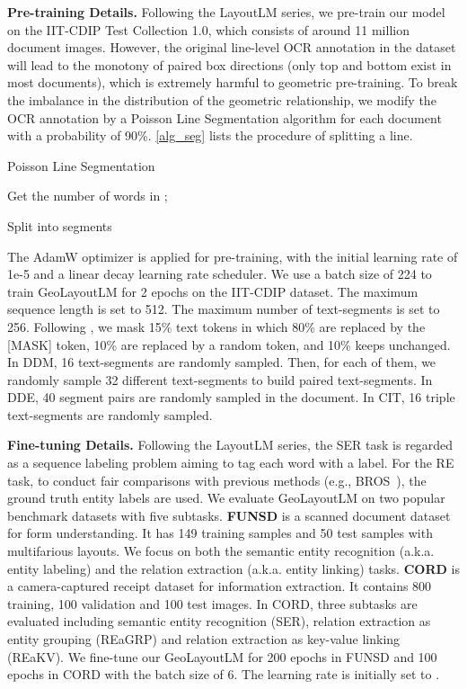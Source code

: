 \documentclass[10pt,twocolumn,letterpaper]{article}
\begin{document}
\noindent \textbf{Pre-training Details.}
Following the LayoutLM series\cite{xu2020layoutlm,xu2020layoutlmv2,huang2022layoutlmv3}, we pre-train our model on the IIT-CDIP Test Collection 1.0\cite{lewis2006building}, which consists of around 11 million document images.
However, the original line-level OCR annotation in the dataset will lead to the monotony of paired box directions (only top and bottom exist in most documents), which is extremely harmful to geometric pre-training.
To break the imbalance in the distribution of the geometric relationship, we modify the OCR annotation by a Poisson Line Segmentation algorithm for each document with a probability of 90\%. \cref{alg_seg} lists the procedure of splitting a line.

\begin{algorithm}
  \caption{Poisson Line Segmentation}\label{alg_seg}
  Get the number of words in \;
  ; \footnotesize{}
  \eIf{} {
    
  }{
    \;
    Split  into  segments \;
  }
\end{algorithm}

The AdamW optimizer is applied for pre-training, with the initial learning rate of 1e-5 and a linear decay learning rate scheduler.
We use a batch size of 224 to train GeoLayoutLM for 2 epochs on the IIT-CDIP dataset.
The maximum sequence length is set to 512. The maximum number of text-segments is set to 256.
Following \cite{xu2020layoutlm,xu2020layoutlmv2,huang2022layoutlmv3}, we mask 15\% text tokens in which 80\% are replaced by the [MASK] token, 10\% are replaced by a random token, and 10\% keeps unchanged.
In DDM, 16 text-segments are randomly sampled. Then, for each of them, we randomly sample 32 different text-segments to build paired text-segments.
In DDE, 40 segment pairs are randomly sampled in the document.
In CIT, 16 triple text-segments are randomly sampled.


\noindent \textbf{Fine-tuning Details.}
Following the LayoutLM series\cite{gu2022xylayoutlm,xu2020layoutlmv2,huang2022layoutlmv3}, the SER task is regarded as a sequence labeling problem aiming to tag each word with a label.
For the RE task, to conduct fair comparisons with previous methods (e.g., BROS~\cite{hong2022bros}), the ground truth entity labels are used.
We evaluate GeoLayoutLM on two popular benchmark datasets with five subtasks.
\textbf{FUNSD}\cite{jaume2019funsd} is a scanned document dataset for form understanding. It has 149 training samples and 50 test samples with multifarious layouts. We focus on both the semantic entity recognition (a.k.a. entity labeling) and the relation extraction (a.k.a. entity linking) tasks.
\textbf{CORD}\cite{park2019cord} is a camera-captured receipt dataset for information extraction. It contains 800 training, 100 validation and 100 test images. In CORD, three subtasks are evaluated including semantic entity recognition (SER), relation extraction as entity grouping (REaGRP) and relation extraction as key-value linking (REaKV).
We fine-tune our GeoLayoutLM for 200 epochs in FUNSD and 100 epochs in CORD with the batch size of 6. The learning rate is initially set to .
\end{document}
